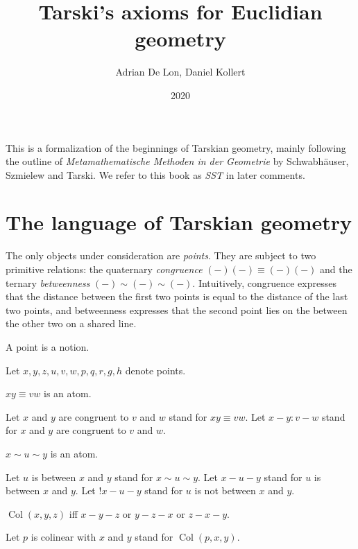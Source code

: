 \documentclass{article}
\title{Tarski's axioms for Euclidian geometry}
\author{Adrian De Lon, Daniel Kollert}
\date{2020}
\newcommand{\Cong}[4]{#1 #2 \equiv #3 #4}
\newcommand{\Betw}[3]{#1 {\sim} #2 {\sim} #3}
\newcommand{\Col}[3]{\operatorname{Col}(#1, #2, #3)}
\begin{document}

  \maketitle

  This is a formalization of the beginnings of Tarskian geometry,
  mainly following the outline of \textit{Metamathematische Methoden in der Geometrie} by
  Schwabhäuser, Szmielew and Tarski.
  We refer to this book as \textit{SST} in later comments.

  \section{The language of Tarskian geometry}

  The only objects under consideration are \textit{points}.
  They are subject to two primitive relations:
  the quaternary \textit{congruence} $\Cong{(-)}{(-)}{(-)}{(-)}$
  and the ternary \textit{betweenness} $\Betw{(-)}{(-)}{(-)}$.
  Intuitively, congruence expresses that the distance between the first two points is equal to the distance of the last two points, and betweenness expresses that
  the second point lies on the between the other two on a shared line.


  \begin{forthel}

    \begin{signature}
      A point is a notion.
    \end{signature}

    Let $x, y, z, u, v, w, p, q, r, g, h$ denote points.


    \begin{signature}
      $\Cong{x}{y}{v}{w}$ is an atom.
    \end{signature}

    Let $x$ and $y$ are congruent to $v$ and $w$ stand for $\Cong{x}{y}{v}{w}$.
    Let $x-y : v-w$ stand for $x$ and $y$ are congruent to $v$ and $w$.

    \begin{signature}
      $\Betw{x}{u}{y}$ is an atom.
    \end{signature}

    Let $u$ is between $x$ and $y$ stand for $\Betw{x}{u}{y}$.
    Let $x-u-y$ stand for $u$ is between $x$ and $y$.
    Let $!x-u-y$ stand for $u$ is not between $x$ and $y$.


    \begin{definition}
      $\Col{x}{y}{z}$ iff $x-y-z$ or $y-z-x$ or $z-x-y$.
    \end{definition}

    Let $p$ is colinear with $x$ and $y$ stand for $\Col{p}{x}{y}$.
  \end{forthel}
\end{document}
